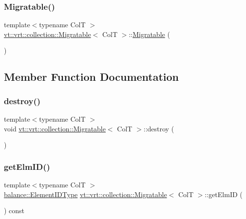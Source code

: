 \subsubsection{\texorpdfstring{Migratable()}{Migratable()}}
{\footnotesize\ttfamily template$<$typename ColT $>$ \\
\hyperlink{structvt_1_1vrt_1_1collection_1_1_migratable}{vt\+::vrt\+::collection\+::\+Migratable}$<$ ColT $>$\+::\hyperlink{structvt_1_1vrt_1_1collection_1_1_migratable}{Migratable} (\begin{DoxyParamCaption}{ }\end{DoxyParamCaption})\hspace{0.3cm}{\ttfamily [inline]}}



\subsection{Member Function Documentation}
\mbox{\label{structvt_1_1vrt_1_1collection_1_1_migratable_a06210254fae9b543b5db7543760ae33d}} 
\subsubsection{\texorpdfstring{destroy()}{destroy()}}
{\footnotesize\ttfamily template$<$typename ColT $>$ \\
void \hyperlink{structvt_1_1vrt_1_1collection_1_1_migratable}{vt\+::vrt\+::collection\+::\+Migratable}$<$ ColT $>$\+::destroy (\begin{DoxyParamCaption}{ }\end{DoxyParamCaption})\hspace{0.3cm}{\ttfamily [virtual]}}

\mbox{\label{structvt_1_1vrt_1_1collection_1_1_migratable_acf870053154679cbcda64e42ff479302}} 
\subsubsection{\texorpdfstring{get\+Elm\+I\+D()}{getElmID()}}
{\footnotesize\ttfamily template$<$typename ColT $>$ \\
\hyperlink{namespacevt_1_1vrt_1_1collection_1_1balance_a14c8d2c972f2913aa3f1636e5be0a120}{balance\+::\+Element\+I\+D\+Type} \hyperlink{structvt_1_1vrt_1_1collection_1_1_migratable}{vt\+::vrt\+::collection\+::\+Migratable}$<$ ColT $>$\+::get\+Elm\+ID (\begin{DoxyParamCaption}{ }\end{DoxyParamCaption}) const\hspace{0.3cm}{\ttfamily [inline]}}

